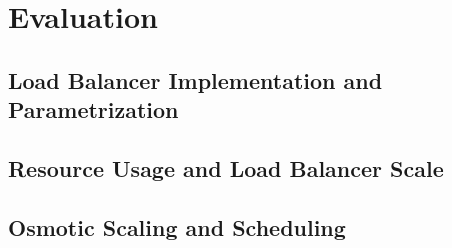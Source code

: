 \chapter{Evaluation}






\section{Load Balancer Implementation and Parametrization}



\section{Resource Usage and Load Balancer Scale}




\section{Osmotic Scaling and Scheduling}


